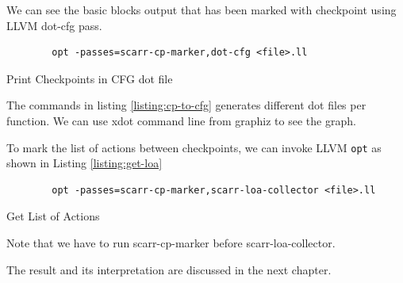 We can see the basic blocks output that has been marked with checkpoint using
LLVM dot-cfg pass.

\begin{listing}[htbp]
    \begin{verbatim}
        opt -passes=scarr-cp-marker,dot-cfg <file>.ll
    \end{verbatim}
    \caption{Print Checkpoints in CFG dot file}    
    \label{listing:cp-to-cfg}
\end{listing}

The commands in listing \ref{listing:cp-to-cfg} generates different dot files
per function. We can use xdot command line from graphiz to see the graph. 

To mark the list of actions between checkpoints, we can invoke LLVM \texttt{opt}
as shown in Listing \ref{listing:get-loa}

\begin{listing}
    \begin{verbatim}
        opt -passes=scarr-cp-marker,scarr-loa-collector <file>.ll
    \end{verbatim}
    \caption{Get List of Actions}    
    \label{listing:get-loa}
\end{listing}

Note that we have to run scarr-cp-marker before scarr-loa-collector.

The result and its interpretation are discussed in the next chapter.